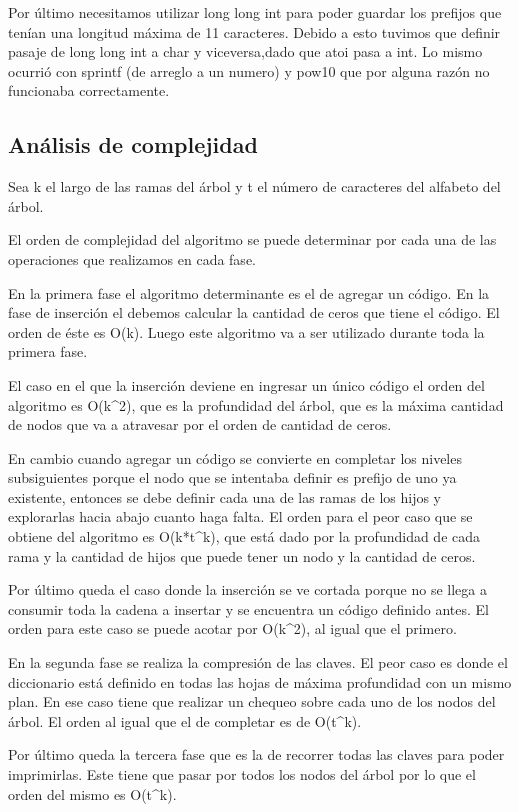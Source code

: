 Por último necesitamos utilizar long long int para poder guardar los prefijos que tenían una longitud máxima de 11 caracteres.
Debido a esto tuvimos que definir pasaje de long long int a char y viceversa,dado que atoi pasa a int. 
Lo mismo ocurrió con sprintf (de arreglo a un numero) y pow10 que por alguna razón no funcionaba correctamente. 

\subsection*{Análisis de complejidad}

Sea k el largo de las ramas del árbol y t el número de caracteres del alfabeto del árbol.


El orden de complejidad del algoritmo se puede determinar por cada una de las operaciones que realizamos
en cada fase. 

En la primera fase el algoritmo determinante es el de agregar un código. 
En la fase de inserción el debemos calcular la cantidad de ceros que tiene el código. 
El orden de éste es O(k). Luego este algoritmo va a ser utilizado durante toda la primera fase.

El caso en el que la inserción deviene en ingresar un único código el orden del algoritmo es O(k^2), 
que es la profundidad del árbol, que es la máxima cantidad de nodos que va a atravesar por el orden de cantidad de ceros.

En cambio cuando agregar un código se convierte en completar los niveles subsiguientes porque
el nodo que se intentaba definir es prefijo de uno ya existente, entonces se debe definir cada una de las ramas
de los hijos y explorarlas hacia abajo cuanto haga falta. El orden para el peor caso que se obtiene del algoritmo es 
O(k*t^k), que está dado por la profundidad de cada rama y la cantidad de hijos que puede tener un nodo y la cantidad de ceros.

Por último queda el caso donde la inserción se ve cortada porque no se llega a consumir toda la cadena a insertar 
y se encuentra un código definido antes. El orden para este caso se puede acotar por O(k^2), al igual que el primero.

En la segunda fase se realiza la compresión de las claves. El peor caso es donde el diccionario está definido en todas las hojas
de máxima profundidad con un mismo plan. En ese caso tiene que realizar un chequeo sobre cada uno de los nodos del árbol.
El orden al igual que el de completar es de O(t^k).

Por último queda la tercera fase que es la de recorrer todas las claves para poder imprimirlas.
Este tiene que pasar por todos los nodos del árbol por lo que el orden del mismo es O(t^k).
